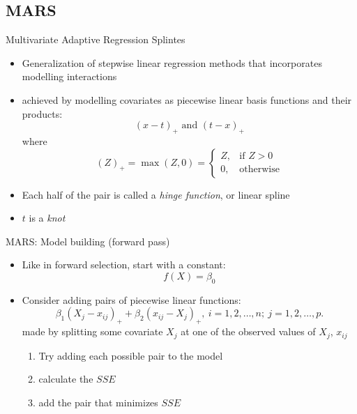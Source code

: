 \documentclass{beamer}
\begin{document}

\subsection{MARS} %
\label{ssub:mars}

\begin{frame}{Multivariate Adaptive Regression Splintes}
  \begin{itemize}[<+->]
    \item Generalization of stepwise linear regression methods that incorporates modelling interactions
    \item achieved by modelling covariates as piecewise linear basis functions and their products:
  \begin{equation*} \label{eq:bases}
    (x - t)_{+} \text{ and } (t - x)_{+}
  \end{equation*} where
  \begin{equation*}
    (Z)_{+} = \max(Z, 0) = \begin{cases}
    Z, & \text{if } Z > 0 \\
    0, & \text{otherwise}
    \end{cases}
  \end{equation*}
  
  \item Each half of the pair is called a \emph{hinge function}, or linear spline
  \item $t$ is a \emph{knot}
  \end{itemize}
\end{frame}

\begin{frame}{MARS: Model building (forward pass)}
  
  \begin{itemize}[<+->]
    \item Like in forward selection, start with a constant:
    \begin{equation*}
      f(X) = \beta_{0}
    \end{equation*}
    \item Consider adding pairs of piecewise linear functions:
  \begin{equation*}
  \beta_{1} (X_{j} - x_{ij})_{+} + \beta_{2}(x_{ij} - X_{j})_{+}, \ i = 1, 2, \ldots, n; \ j = 1, 2, \ldots, p.
  \end{equation*}
   made by splitting some covariate $X_{j}$ at one of the observed values of $X_{j}$, $x_{ij}$
  \begin{enumerate}
    \item Try adding each possible pair to the model
    \item calculate the $SSE$
    \item add the pair that minimizes $SSE$
  \end{enumerate}
  \end{itemize}

\end{frame}
\end{document}
